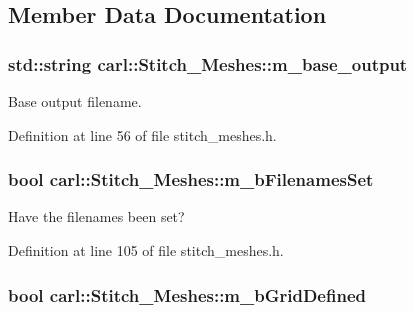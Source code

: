 \subsection{Member Data Documentation}
\hypertarget{classcarl_1_1_stitch___meshes_a62dc54f7822611da525d10a57595f898}{}
\subsubsection[{m\+\_\+base\+\_\+output}]{\setlength{\rightskip}{0pt plus 5cm}std\+::string carl\+::\+Stitch\+\_\+\+Meshes\+::m\+\_\+base\+\_\+output\hspace{0.3cm}{\ttfamily [protected]}}\label{classcarl_1_1_stitch___meshes_a62dc54f7822611da525d10a57595f898}


Base output filename. 



Definition at line 56 of file stitch\+\_\+meshes.\+h.

\hypertarget{classcarl_1_1_stitch___meshes_a3f8957cc3d3184c5e3e4ba6d71c18d8f}{}
\subsubsection[{m\+\_\+b\+Filenames\+Set}]{\setlength{\rightskip}{0pt plus 5cm}bool carl\+::\+Stitch\+\_\+\+Meshes\+::m\+\_\+b\+Filenames\+Set\hspace{0.3cm}{\ttfamily [protected]}}\label{classcarl_1_1_stitch___meshes_a3f8957cc3d3184c5e3e4ba6d71c18d8f}


Have the filenames been set? 



Definition at line 105 of file stitch\+\_\+meshes.\+h.

\hypertarget{classcarl_1_1_stitch___meshes_a9bc08080ddc1f39ee4456aff9eeca725}{}
\subsubsection[{m\+\_\+b\+Grid\+Defined}]{\setlength{\rightskip}{0pt plus 5cm}bool carl\+::\+Stitch\+\_\+\+Meshes\+::m\+\_\+b\+Grid\+Defined\hspace{0.3cm}{\ttfamily [protected]}}\label{classcarl_1_1_stitch___meshes_a9bc08080ddc1f39ee4456aff9eeca725}



